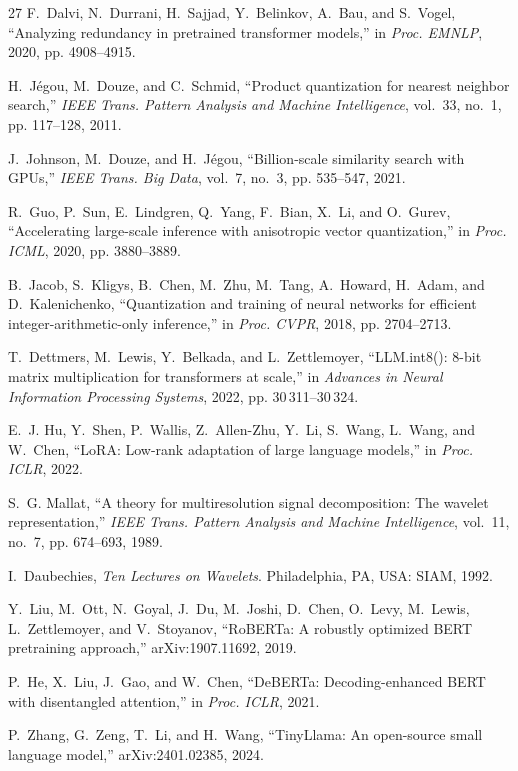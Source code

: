 \documentclass[conference]{IEEEtran}
\begin{document}
\begin{thebibliography}{27}
F.~Dalvi, N.~Durrani, H.~Sajjad, Y.~Belinkov, A.~Bau, and
S.~Vogel, ``Analyzing redundancy in pretrained transformer models,''
in \emph{Proc. EMNLP}, 2020, pp. 4908--4915.

H.~J\'egou, M.~Douze, and C.~Schmid, ``Product quantization for nearest
neighbor search,'' \emph{IEEE Trans. Pattern Analysis and Machine
Intelligence}, vol.~33, no.~1, pp. 117--128, 2011.

J.~Johnson, M.~Douze, and H.~J\'egou, ``Billion-scale similarity search
with GPUs,'' \emph{IEEE Trans. Big Data}, vol.~7, no.~3, pp. 535--547,
2021.

R.~Guo, P.~Sun, E.~Lindgren, Q.~Yang, F.~Bian, X.~Li, and O.~Gurev,
``Accelerating large-scale inference with anisotropic vector
quantization,'' in \emph{Proc. ICML}, 2020, pp. 3880--3889.

B.~Jacob, S.~Kligys, B.~Chen, M.~Zhu, M.~Tang, A.~Howard, H.~Adam, and
D.~Kalenichenko, ``Quantization and training of neural networks for
efficient integer-arithmetic-only inference,'' in \emph{Proc. CVPR},
2018, pp. 2704--2713.

T.~Dettmers, M.~Lewis, Y.~Belkada, and L.~Zettlemoyer, ``LLM.int8():
8-bit matrix multiplication for transformers at scale,'' in
\emph{Advances in Neural Information Processing Systems}, 2022,
pp. 30\,311--30\,324.

E.~J. Hu, Y.~Shen, P.~Wallis, Z.~Allen-Zhu, Y.~Li, S.~Wang, L.~Wang,
and W.~Chen, ``LoRA: Low-rank adaptation of large language models,''
in \emph{Proc. ICLR}, 2022.

S.~G. Mallat, ``A theory for multiresolution signal decomposition: The
wavelet representation,'' \emph{IEEE Trans. Pattern Analysis and Machine
Intelligence}, vol.~11, no.~7, pp. 674--693, 1989.

I.~Daubechies, \emph{Ten Lectures on Wavelets}. Philadelphia, PA, USA:
SIAM, 1992.

Y.~Liu, M.~Ott, N.~Goyal, J.~Du, M.~Joshi, D.~Chen, O.~Levy, M.~Lewis,
L.~Zettlemoyer, and V.~Stoyanov, ``RoBERTa: A robustly optimized BERT
pretraining approach,'' arXiv:1907.11692, 2019.

P.~He, X.~Liu, J.~Gao, and W.~Chen, ``DeBERTa: Decoding-enhanced BERT
with disentangled attention,'' in \emph{Proc. ICLR}, 2021.

P.~Zhang, G.~Zeng, T.~Li, and H.~Wang, ``TinyLlama: An open-source small
language model,'' arXiv:2401.02385, 2024.


\end{thebibliography}
\end{document}
